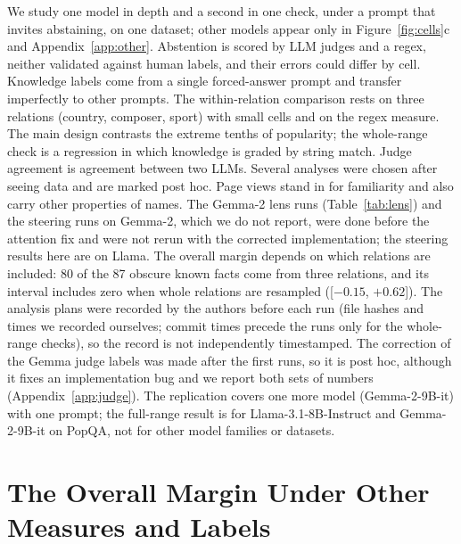 \documentclass[letterpaper]{article} %
\begin{document}
We study one model in depth and a second in one check, under a prompt that invites abstaining, on one dataset; other models appear only in Figure~\ref{fig:cells}c and Appendix~\ref{app:other}. Abstention is scored by LLM judges and a regex, neither validated against human labels, and their errors could differ by cell. Knowledge labels come from a single forced-answer prompt and transfer imperfectly to other prompts. The within-relation comparison rests on three relations (country, composer, sport) with small cells and on the regex measure. The main design contrasts the extreme tenths of popularity; the whole-range check is a regression in which knowledge is graded by string match. Judge agreement is agreement between two LLMs. Several analyses were chosen after seeing data and are marked post hoc. Page views stand in for familiarity and also carry other properties of names. The Gemma-2 lens runs (Table~\ref{tab:lens}) and the steering runs on Gemma-2, which we do not report, were done before the attention fix and were not rerun with the corrected implementation; the steering results here are on Llama. The overall margin depends on which relations are included: 80 of the 87 obscure known facts come from three relations, and its interval includes zero when whole relations are resampled ([$-0.15$, $+0.62$]). The analysis plans were recorded by the authors before each run (file hashes and times we recorded ourselves; commit times precede the runs only for the whole-range checks), so the record is not independently timestamped. The correction of the Gemma judge labels was made after the first runs, so it is post hoc, although it fixes an implementation bug and we report both sets of numbers (Appendix~\ref{app:judge}). The replication covers one more model (Gemma-2-9B-it) with one prompt; the full-range result is for Llama-3.1-8B-Instruct and Gemma-2-9B-it on PopQA, not for other model families or datasets.



\appendix

\section{The Overall Margin Under Other Measures and Labels}
\label{app:robust}
\end{document}
